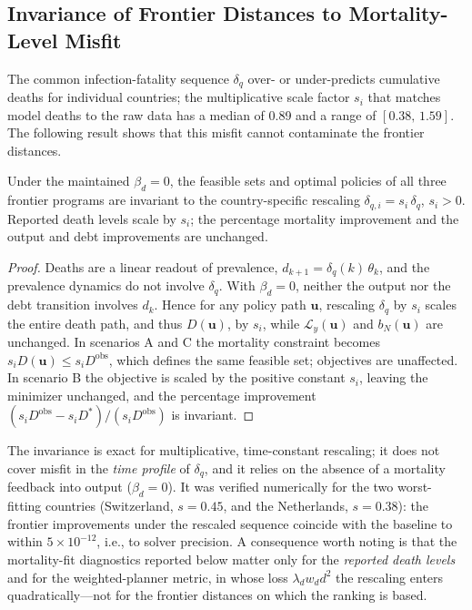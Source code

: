 \documentclass[12pt, a4paper]{article}
\begin{document}
\subsection{Invariance of Frontier Distances to Mortality-Level Misfit}
\label{app:ifr_invariance}

The common infection-fatality sequence \(\delta_q\) over- or under-predicts
cumulative deaths for individual countries; the multiplicative scale factor
\(s_i\) that matches model deaths to the raw data has a median of 0.89 and a
range of \([0.38,\, 1.59]\). The following result shows that this misfit
cannot contaminate the frontier distances.

\begin{proposition}
Under the maintained \(\beta_d = 0\), the feasible sets and optimal policies
of all three frontier programs are invariant to the country-specific
rescaling \(\delta_{q,i} = s_i\, \delta_q\), \(s_i > 0\). Reported death
levels scale by \(s_i\); the percentage mortality improvement and the output
and debt improvements are unchanged.
\end{proposition}

\begin{proof}
Deaths are a linear readout of prevalence, \(d_{k+1} = \delta_q(k)\,
\theta_k\), and the prevalence dynamics do not involve \(\delta_q\). With
\(\beta_d = 0\), neither the output nor the debt transition involves
\(d_k\). Hence for any policy path \(\bm{u}\), rescaling \(\delta_q\) by
\(s_i\) scales the entire death path, and thus \(D(\bm{u})\), by \(s_i\),
while \(\mathcal{L}_y(\bm{u})\) and \(b_N(\bm{u})\) are unchanged. In
scenarios A and C the mortality constraint becomes \(s_i D(\bm{u}) \le s_i
D^{\text{obs}}\), which defines the same feasible set; objectives are
unaffected. In scenario B the objective is scaled by the positive constant
\(s_i\), leaving the minimizer unchanged, and the percentage improvement
\((s_i D^{\text{obs}} - s_i D^{*})/(s_i D^{\text{obs}})\) is invariant.
\end{proof}

The invariance is exact for multiplicative, time-constant rescaling; it does
not cover misfit in the \emph{time profile} of \(\delta_q\), and it relies on
the absence of a mortality feedback into output (\(\beta_d = 0\)). It was
verified numerically for the two worst-fitting countries (Switzerland,
\(s = 0.45\), and the Netherlands, \(s = 0.38\)): the frontier improvements
under the rescaled sequence coincide with the baseline to within
\(5 \times 10^{-12}\), i.e., to solver precision. A consequence worth noting
is that the mortality-fit diagnostics reported below matter only for the
\emph{reported death levels} and for the weighted-planner metric, in whose
loss \(\lambda_d w_d d^2\) the rescaling enters quadratically---not for the
frontier distances on which the ranking is based.
\end{document}

